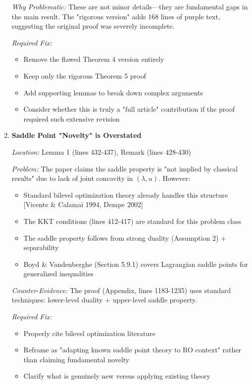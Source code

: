 \documentclass[journal,twoside,web]{ieeecolor}
\begin{document}
\begin{enumerate}
\textit{Why Problematic:} These are not minor details—they are fundamental gaps in the main result. The "rigorous version" adds 168 lines of purple text, suggesting the original proof was severely incomplete.

\textit{Required Fix:}
\begin{itemize}
\item Remove the flawed Theorem 4 version entirely
\item Keep only the rigorous Theorem 5 proof
\item Add supporting lemmas to break down complex arguments
\item Consider whether this is truly a "full article" contribution if the proof required such extensive revision
\end{itemize}

\item \textbf{Saddle Point "Novelty" is Overstated}

\textit{Location:} Lemma 1 (lines 432-437), Remark (lines 428-430)

\textit{Problem:} The paper claims the saddle property is "not implied by classical results" due to lack of joint concavity in $(\lambda,u)$. However:

\begin{itemize}
\item Standard bilevel optimization theory already handles this structure [Vicente \& Calamai 1994, Dempe 2002]
\item The KKT conditions (lines 412-417) are standard for this problem class
\item The saddle property follows from strong duality (Assumption 2) + separability
\item Boyd \& Vandenberghe (Section 5.9.1) covers Lagrangian saddle points for generalized inequalities
\end{itemize}

\textit{Counter-Evidence:} The proof (Appendix, lines 1183-1235) uses standard techniques: lower-level duality + upper-level saddle property.

\textit{Required Fix:}
\begin{itemize}
\item Properly cite bilevel optimization literature
\item Reframe as "adapting known saddle point theory to RO context" rather than claiming fundamental novelty
\item Clarify what is genuinely new versus applying existing theory
\end{itemize}


\end{enumerate}
\end{document}
